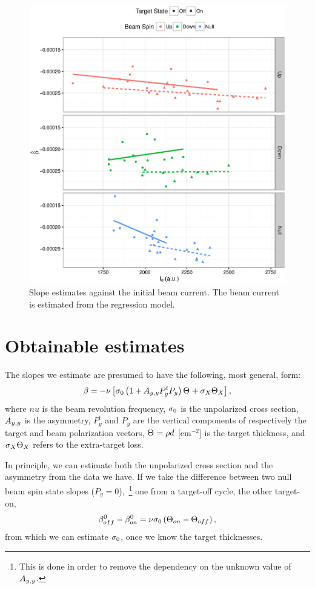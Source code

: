 \documentclass{report}
\begin{document}
\begin{figure}[H]
	\centering
	\includegraphics{Slope_VS_IniCurrent_2016.eps}
	\caption{Slope estimates against the initial beam current. The beam current is estimated from the regression model.\label{fig:Slp_VS_I0}}
\end{figure}

\section{Obtainable estimates}

The slopes we estimate are presumed to have the following, most general, form:
\begin{equation}
	\slp = -\nu\bkt*{\CS[0]\bkt{1 + \Ayy P^t_y P_y}\Thick + \CS[X]\Thick[X]},
\end{equation}
where $nu$ is the beam revolution frequency, $\CS[0]$ is the unpolarized cross section, $\Ayy$ is the asymmetry, $P^t_y$ and $P_y$ are the vertical components of respectively the target and beam polarization vectors, $\Thick = \rho d$ [cm$^{-2}$] is the target thickness, and $\CS[X]\Thick[X]$ refers to the extra-target loss.

In principle, we can estimate both the unpolarized cross section and the asymmetry from the data we have. If we take the difference between two null beam spin state slopes ($P_y = 0$),~\footnote{This is done in order to remove the dependency on the unknown value of $\Ayy$.} one from a target-off cycle, the other target-on, 
\[
	\slp[off]^0 - \slp[on]^0 = \nu\CS[0]\bkt{\Thick[on]-\Thick[off]},
\]
from which we can estimate $\CS[0]$, once we know the target thicknesses.
\end{document}
